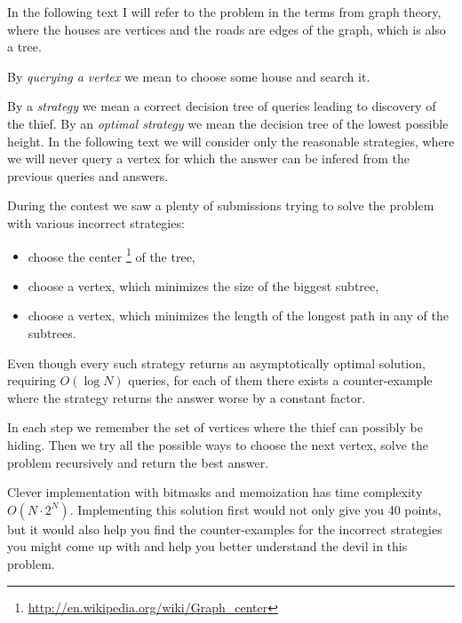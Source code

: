 


In the following text I will refer to the problem in the terms from graph theory,
where the houses are vertices and the roads are edges of the graph, which is also a
tree.

By \emph{querying a vertex} we mean to choose some house and search it.

By a \emph{strategy} we mean a correct decision tree of queries leading to discovery of the thief.
By an \emph{optimal strategy} we mean the decision tree of the lowest possible height.
In the following text we will consider only the reasonable strategies, where
we will never query a vertex for which the answer can be infered from the previous queries and answers.



During the contest we saw a plenty of submissions trying to solve the problem
with various incorrect strategies:
\begin{itemize}
\item choose the center \footnote{\url{http://en.wikipedia.org/wiki/Graph\_center}} of the tree,
\item choose a vertex, which minimizes the size of the biggest subtree,
\item choose a vertex, which minimizes the length of the longest path in any of the subtrees.
\end{itemize}

Even though every such strategy returns an asymptotically optimal solution,
requiring $O(\log N)$ queries, for each of them there exists a counter-example
where the strategy returns the answer worse by a constant factor.



In each step we remember the set of vertices where the thief can possibly be hiding.
Then we try all the possible ways to choose the next vertex, solve the problem
recursively and return the best answer.

Clever implementation with bitmasks and memoization has time complexity $O(N\cdot2^N)$.
Implementing this solution first would not only give you 40 points, but it would also
help you find the counter-examples for the incorrect strategies you might come
up with and help you better understand the devil in this problem.


